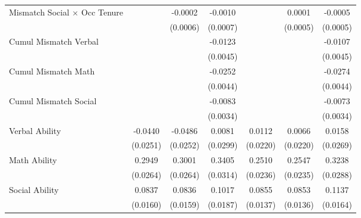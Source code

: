 {\begin{longtable}{l*{6}{c}}
Mismatch Social $\times$ Occ Tenure&                     &     -0.0002         &     -0.0010         &                     &      0.0001         &     -0.0005         \\
                    &                     &    (0.0006)         &    (0.0007)         &                     &    (0.0005)         &    (0.0005)         \\
Cumul Mismatch Verbal&                     &                     &     -0.0123\sym{***}&                     &                     &     -0.0107\sym{**} \\
                    &                     &                     &    (0.0045)         &                     &                     &    (0.0045)         \\
Cumul Mismatch Math &                     &                     &     -0.0252\sym{***}&                     &                     &     -0.0274\sym{***}\\
                    &                     &                     &    (0.0044)         &                     &                     &    (0.0044)         \\
Cumul Mismatch Social&                     &                     &     -0.0083\sym{**} &                     &                     &     -0.0073\sym{**} \\
                    &                     &                     &    (0.0034)         &                     &                     &    (0.0034)         \\
Verbal Ability      &     -0.0440\sym{*}  &     -0.0486\sym{*}  &      0.0081         &      0.0112         &      0.0066         &      0.0158         \\
                    &    (0.0251)         &    (0.0252)         &    (0.0299)         &    (0.0220)         &    (0.0220)         &    (0.0269)         \\
Math Ability        &      0.2949\sym{***}&      0.3001\sym{***}&      0.3405\sym{***}&      0.2510\sym{***}&      0.2547\sym{***}&      0.3238\sym{***}\\
                    &    (0.0264)         &    (0.0264)         &    (0.0314)         &    (0.0236)         &    (0.0235)         &    (0.0288)         \\
Social Ability      &      0.0837\sym{***}&      0.0836\sym{***}&      0.1017\sym{***}&      0.0855\sym{***}&      0.0853\sym{***}&      0.1137\sym{***}\\
                    &    (0.0160)         &    (0.0159)         &    (0.0187)         &    (0.0137)         &    (0.0136)         &    (0.0164)         \\

\end{longtable}}
